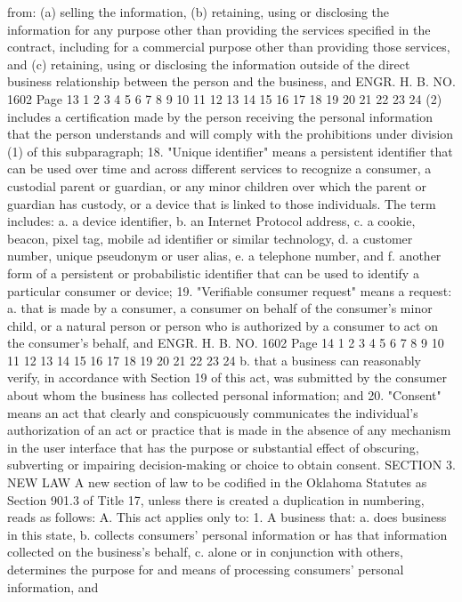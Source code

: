 from:
(a) selling the information,
(b) retaining, using or disclosing the
information for any purpose other than
providing the services specified in the
contract, including for a commercial purpose
other than providing those services, and
(c) retaining, using or disclosing the
information outside of the direct business
relationship between the person and the
business, and
ENGR. H. B. NO. 1602 Page 13
1
2
3
4
5
6
7
8
9
10
11
12
13
14
15
16
17
18
19
20
21
22
23
24
(2) includes a certification made by the person
receiving the personal information that the
person understands and will comply with the
prohibitions under division (1) of this
subparagraph;
18. "Unique identifier" means a persistent identifier that can
be used over time and across different services to recognize a
consumer, a custodial parent or guardian, or any minor children over
which the parent or guardian has custody, or a device that is linked
to those individuals. The term includes:
a. a device identifier,
b. an Internet Protocol address,
c. a cookie, beacon, pixel tag, mobile ad identifier or
similar technology,
d. a customer number, unique pseudonym or user alias,
e. a telephone number, and
f. another form of a persistent or probabilistic
identifier that can be used to identify a particular
consumer or device;
19. "Verifiable consumer request" means a request:
a. that is made by a consumer, a consumer on behalf of
the consumer's minor child, or a natural person or
person who is authorized by a consumer to act on the
consumer's behalf, and
ENGR. H. B. NO. 1602 Page 14
1
2
3
4
5
6
7
8
9
10
11
12
13
14
15
16
17
18
19
20
21
22
23
24
b. that a business can reasonably verify, in accordance
with Section 19 of this act, was submitted by the
consumer about whom the business has collected
personal information; and
20. "Consent" means an act that clearly and conspicuously
communicates the individual's authorization of an act or practice
that is made in the absence of any mechanism in the user interface
that has the purpose or substantial effect of obscuring, subverting
or impairing decision-making or choice to obtain consent.
SECTION 3. NEW LAW A new section of law to be codified
in the Oklahoma Statutes as Section 901.3 of Title 17, unless there
is created a duplication in numbering, reads as follows:
A. This act applies only to:
1. A business that:
a. does business in this state,
b. collects consumers' personal information or has that
information collected on the business's behalf,
c. alone or in conjunction with others, determines the
purpose for and means of processing consumers'
personal information, and

